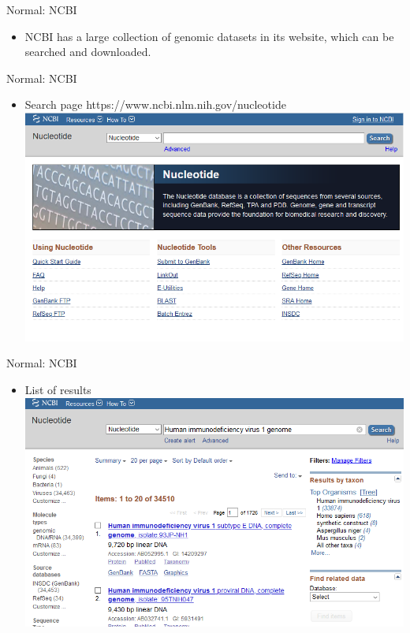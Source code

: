 \documentclass{beamer}
\begin{document}
    
    
    
    \begin{frame}{Normal: NCBI}
        \begin{itemize}
            \item NCBI has a large collection of genomic datasets in its website, which can be searched and downloaded.
        \end{itemize}
    \end{frame}
    \begin{frame}{Normal: NCBI}
        \begin{itemize}
            \item Search page https://www.ncbi.nlm.nih.gov/nucleotide
            \includegraphics[scale=0.5]{ncbi1.png}
        \end{itemize}
    \end{frame}
    \begin{frame}{Normal: NCBI}
        \begin{itemize}
            \item List of results
            \includegraphics[scale=0.5]{ncbi2.png}
        \end{itemize}
    \end{frame}
\end{document}
